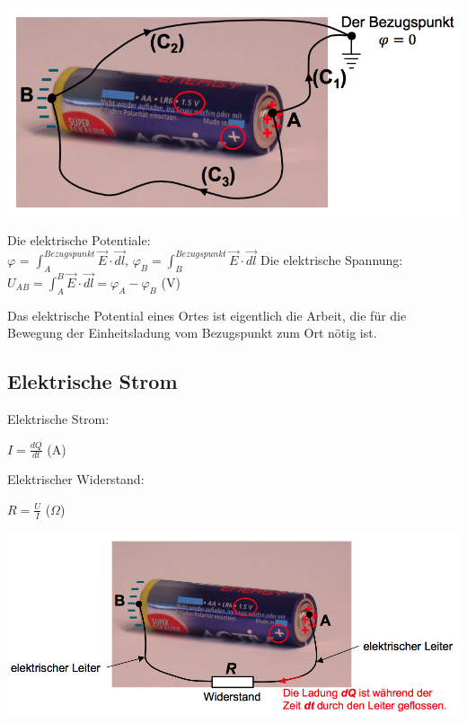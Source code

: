 \begin{minipage}{0.5 \linewidth}
\includegraphics[width = \linewidth]{./Pics/VL1/elPot}
\end{minipage}
\begin{minipage}{0.5 \linewidth}
Die elektrische Potentiale:\\ $\varphi$ = $\int_{A}^{Bezugspunkt} \vec{E} \cdot \vec{dl}$, $\varphi_{B} = \int_{B}^{Bezugspunkt} \vec{E} \cdot \vec{dl}$
Die elektrische Spannung:
$U_{AB} = \int_{A}^{B} \vec{E} \cdot \vec{dl} = \varphi_{A} - \varphi_{B}$  (V)

Das elektrische Potential eines Ortes ist eigentlich die Arbeit, die für die Bewegung der Einheitsladung vom Bezugspunkt zum Ort nötig ist.
 \end{minipage}

\subsection{Elektrische Strom}

\begin{minipage}{0.4 \linewidth}
Elektrische Strom:

$I = \frac{dQ}{dt}$ (A)

Elektrischer Widerstand:

$R = \frac{U}{I}$  ($\Omega$)
\end{minipage}
\begin{minipage}{0.6 \linewidth}
\includegraphics[width = \linewidth]{./Pics/VL1/elStrom}
 \end{minipage}
 
